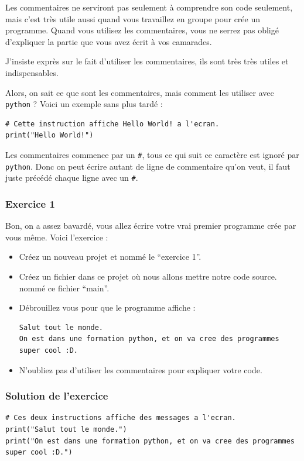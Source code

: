 \documentclass[12pt]{article}
\newcommand{\code}[1]{\colorbox{light-gray}{\texttt{#1}}}
\begin{document}
            Les commentaires ne serviront pas seulement à comprendre son code seulement, mais c'est très utile aussi
            quand vous travaillez en groupe pour crée un programme. Quand vous utilisez les commentaires, vous ne serrez
            pas obligé d'expliquer la partie que vous avez écrit à vos camarades.

            J'insiste exprès sur le fait d'utiliser les commentaires, ils sont très très utiles et indispensables.

            Alors, on sait ce que sont les commentaires, mais comment les utiliser avec \code{python} ? Voici
            un exemple sans plus tardé :
            \begin{lstlisting}[style=code]
# Cette instruction affiche Hello World! a l'ecran.
print("Hello World!")
            \end{lstlisting}

            Les commentaires commence par un \code{\#}, tous ce qui suit ce caractère est ignoré par \code{python}.
            Donc on peut écrire autant de ligne de commentaire qu'on veut, il faut juste précédé chaque ligne avec un
            \code{\#}.

        \subsubsection{Exercice 1}
            Bon, on a assez bavardé, vous allez écrire votre vrai premier programme crée par vous même.
            Voici l'exercice :
            \begin{itemize}
                \item Créez un nouveau projet et nommé le ``exercice 1''.
                \item Créez un fichier dans ce projet où nous allons mettre notre code source. nommé ce fichier
                    ``main''.
                \item Débrouillez vous pour que le programme affiche :
                    \begin{lstlisting}[style=exec_result, breaklines=false]
Salut tout le monde.
On est dans une formation python, et on va cree des programmes super cool :D.
                    \end{lstlisting}
                \item N'oubliez pas d'utiliser les commentaires pour expliquer votre code.
            \end{itemize}

        \subsubsection{Solution de l'exercice}
            \begin{lstlisting}[style=code, breaklines=false]
# Ces deux instructions affiche des messages a l'ecran.
print("Salut tout le monde.")
print("On est dans une formation python, et on va cree des programmes super cool :D.")
            \end{lstlisting}
\end{document}
